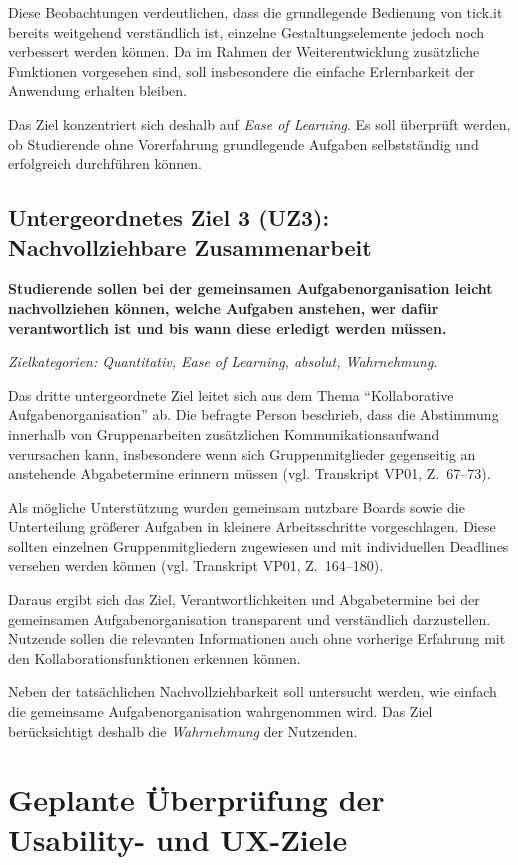 Diese Beobachtungen verdeutlichen, dass die grundlegende Bedienung von tick.it bereits weitgehend verständlich ist, einzelne Gestaltungselemente jedoch noch verbessert werden können.
Da im Rahmen der Weiterentwicklung zusätzliche Funktionen vorgesehen sind, soll insbesondere die einfache Erlernbarkeit der Anwendung erhalten bleiben.

Das Ziel konzentriert sich deshalb auf \textit{Ease of Learning}.
Es soll überprüft werden, ob Studierende ohne Vorerfahrung grundlegende Aufgaben selbstständig und erfolgreich durchführen können.


\subsection*{Untergeordnetes Ziel 3 (UZ3): Nachvollziehbare Zusammenarbeit}

\textbf{Studierende sollen bei der gemeinsamen Aufgabenorganisation leicht nachvollziehen können, welche Aufgaben anstehen, wer dafür verantwortlich ist und bis wann diese erledigt werden müssen.}

\textit{Zielkategorien: Quantitativ, Ease of Learning, absolut, Wahrnehmung.}

Das dritte untergeordnete Ziel leitet sich aus dem Thema \enquote{Kollaborative Aufgabenorganisation} ab.
Die befragte Person beschrieb, dass die Abstimmung innerhalb von Gruppenarbeiten zusätzlichen Kommunikationsaufwand verursachen kann, insbesondere wenn sich Gruppenmitglieder gegenseitig an anstehende Abgabetermine erinnern müssen (vgl. Transkript VP01, Z.~67--73).

Als mögliche Unterstützung wurden gemeinsam nutzbare Boards sowie die Unterteilung größerer Aufgaben in kleinere Arbeitsschritte vorgeschlagen.
Diese sollten einzelnen Gruppenmitgliedern zugewiesen und mit individuellen Deadlines versehen werden können (vgl. Transkript VP01, Z.~164--180).

Daraus ergibt sich das Ziel, Verantwortlichkeiten und Abgabetermine bei der gemeinsamen Aufgabenorganisation transparent und verständlich darzustellen.
Nutzende sollen die relevanten Informationen auch ohne vorherige Erfahrung mit den Kollaborationsfunktionen erkennen können.

Neben der tatsächlichen Nachvollziehbarkeit soll untersucht werden, wie einfach die gemeinsame Aufgabenorganisation wahrgenommen wird.
Das Ziel berücksichtigt deshalb die \textit{Wahrnehmung} der Nutzenden.


\section{Geplante Überprüfung der Usability- und UX-Ziele}
\label{sec:pt-ueberpruefung}

